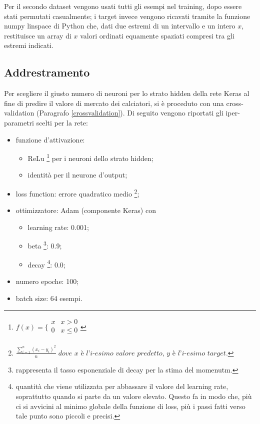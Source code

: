 \documentclass[12pt]{report}
\begin{document}
Per il secondo dataset vengono usati tutti gli esempi nel training, dopo essere stati permutati casualmente; i target invece vengono ricavati tramite la funzione numpy linspace di Python che, dati due estremi di un intervallo e un intero $x$, restituisce un array di $x$ valori ordinati equamente spaziati compresi tra gli estremi indicati.

\subsection{Addrestramento}\label{relu}
Per scegliere il giusto numero di neuroni per lo strato hidden della rete Keras al fine di predire il valore di mercato dei calciatori, si è proceduto con una cross-validation (Paragrafo \ref{crossvalidation}). Di seguito vengono riportati gli iper-parametri scelti per la rete:
\begin{itemize}
\item{funzione d’attivazione}:

\begin{itemize}
\item{ReLu 
\footnote{$f(x) =
\bigg \{
\begin{array}{rl}
x & x > 0 \\
0 & x \leq 0 \\
\end{array}
$
} per i neuroni dello strato hidden};
\item{identità per il neurone d'output};
\end{itemize}

\item{loss function}: errore quadratico medio \footnote{
$\displaystyle{\frac{\sum_{i=1}^n \left(x_i - y_i\right)^2}{n}} \; \textit{dove x è l'i-esimo valore predetto, y è l'i-esimo target}$.
};

\item{ottimizzatore}: Adam (componente Keras) con

\begin{itemize}
\item{learning rate}: 0.001;
\item{beta \footnote{rappresenta il tasso esponenziale di decay per la stima del momenutm.}}: 0.9;
\item{decay \footnote{quantità che viene utilizzata per abbassare il valore del learning rate, soprattutto quando si parte da un valore elevato. Questo fa in modo che, più ci si avvicini al minimo globale della funzione di loss, più i passi fatti verso tale punto sono piccoli e precisi.}}: 0.0;
\end{itemize}

\item{numero epoche}: 100;

\item{batch size}: 64 esempi.
\end{itemize}
\end{document}

